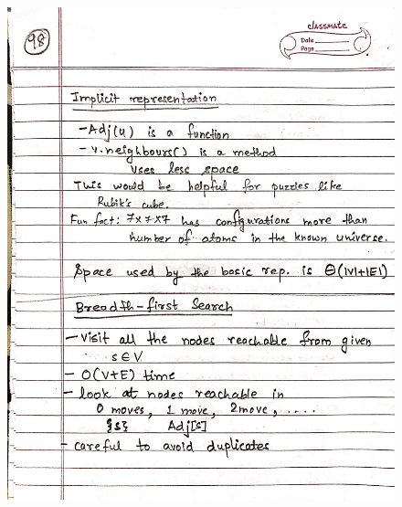 \begin{figure}[H]
    \centering
    \includegraphics[scale=0.25]{"./MIT 6.006/MIT_6006_098"}
\end{figure}
\newpage
